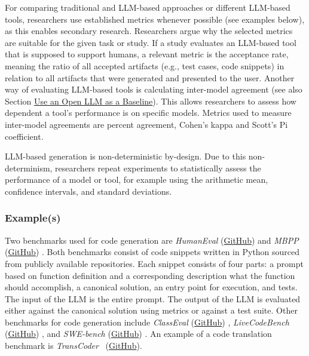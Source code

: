 For comparing traditional and LLM-based approaches or different LLM-based tools, researchers \should use established metrics whenever possible (see examples below), as this enables secondary research.
Researchers \must argue why the selected metrics are suitable for the given task or study. 
If a study evaluates an LLM-based tool that is supposed to support humans, a relevant metric is the acceptance rate, meaning the ratio of all accepted artifacts (e.g., test cases, code snippets) in relation to all artifacts that were generated and presented to the user.
Another way of evaluating LLM-based tools is calculating inter-model agreement (see also Section \href{/guidelines/#use-an-open-llm-as-a-baseline}{Use an Open LLM as a Baseline}).
This allows researchers to assess how dependent a tool's performance is on specific models.
Metrics used to measure inter-model agreements are percent agreement, Cohen's kappa and Scott's Pi coefficient.

LLM-based generation is non-deterministic by-design.
Due to this non-determinism, researchers \should repeat experiments to statistically assess the performance of a model or tool, for example using the arithmetic mean, confidence intervals, and standard deviations.


\subsubsection{Example(s)}

Two benchmarks used for code generation are \emph{HumanEval} (\href{https://github.com/openai/human-eval}{GitHub}) \cite{DBLP:conf/acl/PapineniRWZ02} and \emph{MBPP} (\href{https://huggingface.co/datasets/google-research-datasets/mbpp}{GitHub}) \cite{DBLP:journals/corr/abs-2108-07732}.
Both benchmarks consist of code snippets written in Python sourced from publicly available repositories.
Each snippet consists of four parts: a prompt based on function definition and a corresponding description what the function should accomplish, a canonical solution, an entry point for execution, and tests.
The input of the LLM is the entire prompt.
The output of the LLM is evaluated either against the canonical solution using metrics or against a test suite.
Other benchmarks for code generation include \emph{ClassEval} (\href{https://github.com/openai/human-eval}{GitHub}) \cite{DBLP:journals/corr/abs-2308-01861}, \emph{LiveCodeBench} (\href{https://github.com/LiveCodeBench/LiveCodeBench}{GitHub}) \cite{DBLP:journals/corr/abs-2403-07974}, and \emph{SWE-bench} (\href{https://github.com/swe-bench/SWE-bench}{GitHub}) \cite{DBLP:conf/iclr/JimenezYWYPPN24}.
An example of a code translation benchmark is \emph{TransCoder}~\cite{DBLP:journals/corr/abs-2006-03511} (\href{https://github.com/facebookresearch/CodeGen}{GitHub}). 

